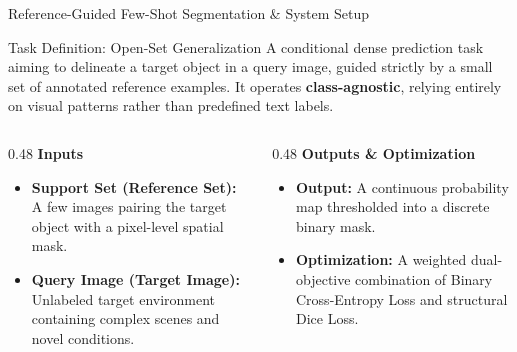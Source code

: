 \documentclass[aspectratio=169, 10pt]{beamer}
\begin{document}
\begin{frame}{Reference-Guided Few-Shot Segmentation \& System Setup}
    \begin{block}{Task Definition: Open-Set Generalization}
        A conditional dense prediction task aiming to delineate a target object in a query image, guided strictly by a small set of annotated reference examples. It operates \textbf{class-agnostic}, relying entirely on visual patterns rather than predefined text labels.
    \end{block}

    \begin{columns}[T]
        \begin{column}{0.48\textwidth}
            \textbf{Inputs}
            \begin{itemize}
                \item \textbf{Support Set (Reference Set):} A few images pairing the target object with a pixel-level spatial mask.
                \item \textbf{Query Image (Target Image):} Unlabeled target environment containing complex scenes and novel conditions.
            \end{itemize}
        \end{column}
        \begin{column}{0.48\textwidth}
            \textbf{Outputs \& Optimization}
            \begin{itemize}
                \item \textbf{Output:} A continuous probability map thresholded into a discrete binary mask.
                \item \textbf{Optimization:} A weighted dual-objective combination of Binary Cross-Entropy Loss and structural Dice Loss.
            \end{itemize}
        \end{column}
    \end{columns}
\end{frame}
\end{document}
